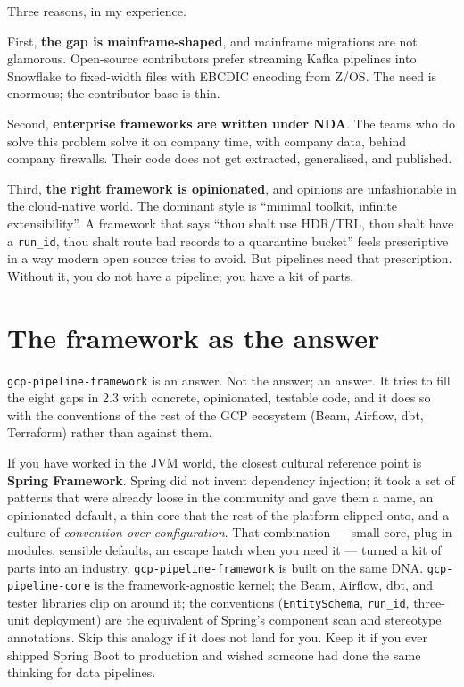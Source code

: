 \documentclass[
  11pt,
  british,
  oneside]{book}
\begin{document}
Three reasons, in my experience.

First, \textbf{the gap is mainframe-shaped}, and mainframe migrations
are not glamorous. Open-source contributors prefer streaming Kafka
pipelines into Snowflake to fixed-width files with EBCDIC encoding from
Z/OS. The need is enormous; the contributor base is thin.

Second, \textbf{enterprise frameworks are written under NDA}. The teams
who do solve this problem solve it on company time, with company data,
behind company firewalls. Their code does not get extracted,
generalised, and published.

Third, \textbf{the right framework is opinionated}, and opinions are
unfashionable in the cloud-native world. The dominant style is ``minimal
toolkit, infinite extensibility''. A framework that says ``thou shalt
use HDR/TRL, thou shalt have a \texttt{run\_id}, thou shalt route bad
records to a quarantine bucket'' feels prescriptive in a way modern open
source tries to avoid. But pipelines need that prescription. Without it,
you do not have a pipeline; you have a kit of parts.

\hypertarget{the-framework-as-the-answer}{%
\section{The framework as the
answer}\label{the-framework-as-the-answer}}

\texttt{gcp-pipeline-framework} is an answer. Not the answer; an answer.
It tries to fill the eight gaps in 2.3 with concrete, opinionated,
testable code, and it does so with the conventions of the rest of the
GCP ecosystem (Beam, Airflow, dbt, Terraform) rather than against them.

If you have worked in the JVM world, the closest cultural reference
point is \textbf{Spring Framework}. Spring did
not invent dependency injection; it took a set of patterns that were
already loose in the community and gave them a name, an opinionated
default, a thin core that the rest of the platform clipped onto, and a
culture of \emph{convention over configuration}. That combination ---
small core, plug-in modules, sensible defaults, an escape hatch when you
need it --- turned a kit of parts into an industry.
\texttt{gcp-pipeline-framework} is built on the same DNA.
\texttt{gcp-pipeline-core} is the framework-agnostic kernel; the Beam,
Airflow, dbt, and tester libraries clip on around it; the conventions
(\texttt{EntitySchema}, \texttt{run\_id}, three-unit deployment) are the
equivalent of Spring's component scan and stereotype annotations. Skip
this analogy if it does not land for you. Keep it if you ever shipped
Spring Boot to production and wished someone had done the same thinking
for data pipelines.
\end{document}
